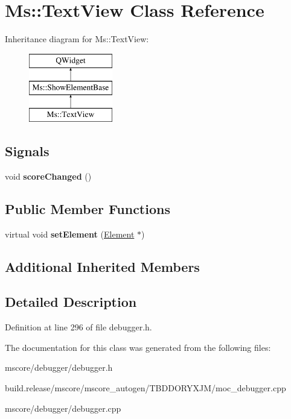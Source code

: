 \hypertarget{class_ms_1_1_text_view}{}\section{Ms\+:\+:Text\+View Class Reference}
\label{class_ms_1_1_text_view}
Inheritance diagram for Ms\+:\+:Text\+View\+:\begin{figure}[H]
\begin{center}
\leavevmode
\includegraphics[height=3.000000cm]{class_ms_1_1_text_view}
\end{center}
\end{figure}
\subsection*{Signals}
\begin{DoxyCompactItemize}
\item 
\mbox{\label{class_ms_1_1_text_view_aa3378520856955bbe05f9da6adea1f6c}} 
void {\bfseries score\+Changed} ()
\end{DoxyCompactItemize}
\subsection*{Public Member Functions}
\begin{DoxyCompactItemize}
\item 
\mbox{\label{class_ms_1_1_text_view_a72316c251e9733560a104367c6c3516b}} 
virtual void {\bfseries set\+Element} (\hyperlink{class_ms_1_1_element}{Element} $\ast$)
\end{DoxyCompactItemize}
\subsection*{Additional Inherited Members}


\subsection{Detailed Description}


Definition at line 296 of file debugger.\+h.



The documentation for this class was generated from the following files\+:\begin{DoxyCompactItemize}
\item 
mscore/debugger/debugger.\+h\item 
build.\+release/mscore/mscore\+\_\+autogen/\+T\+B\+D\+D\+O\+R\+Y\+X\+J\+M/moc\+\_\+debugger.\+cpp\item 
mscore/debugger/debugger.\+cpp\end{DoxyCompactItemize}
